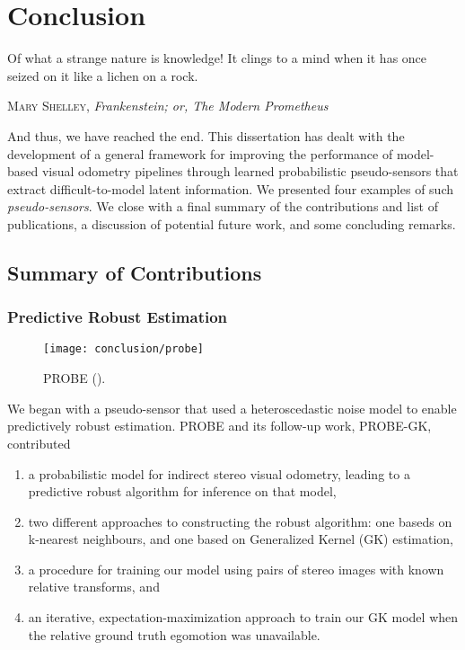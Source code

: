 \chapter{Conclusion}
\epigraph{Of what a strange nature is knowledge! It clings to a mind when it has once seized on it like a lichen on a rock.}{\textsc{Mary Shelley}, \textit{Frankenstein; or, The Modern Prometheus}}


And thus, we have reached the end. This dissertation has dealt with the development of a general framework for improving the performance of model-based visual odometry pipelines through learned probabilistic pseudo-sensors that extract difficult-to-model latent information.  We presented four examples of such \textit{pseudo-sensors}. We close with a final summary of the contributions and list of publications, a discussion of potential future work, and some concluding remarks.

\section{Summary of Contributions}

\subsection{Predictive Robust Estimation}

\begin{wrapfigure}{r}{0.3\textwidth}
  \begin{center}
  	\vspace{-25pt}
    \texttt{[image: conclusion/probe]}
     \vspace{-25pt}
  \end{center}
  \caption{PROBE ().}
  \vspace{-5pt}
\end{wrapfigure}


We began with a pseudo-sensor that used a heteroscedastic noise model to enable predictively robust estimation. PROBE and its follow-up work, PROBE-GK, contributed
\begin{enumerate}
\item a probabilistic model for indirect stereo visual odometry, leading to a predictive robust algorithm for inference on that model,
\item two different approaches to constructing the robust algorithm: one baseds on k-nearest neighbours, and one based on Generalized Kernel (GK) estimation,
\item a procedure for training our model using pairs of stereo images with known relative transforms, and
\item an iterative, expectation-maximization approach to train our GK model when the relative ground truth egomotion was unavailable.
\end{enumerate}

